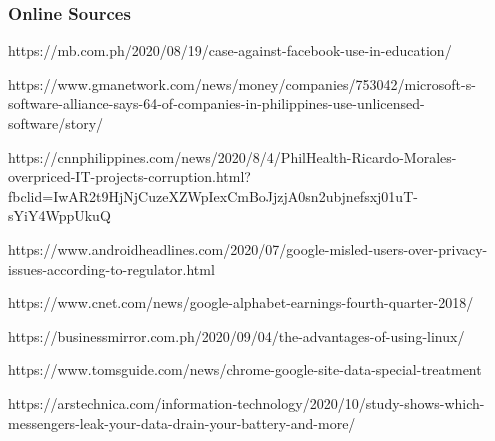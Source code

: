 \documentclass[17pt]{beamer}
\begin{document}
	\begin{frame}
		\frametitle{Online Sources}
		\tiny 
		https://mb.com.ph/2020/08/19/case-against-facebook-use-in-education/
\newline
		
		https://www.gmanetwork.com/news/money/companies/753042/microsoft-s-software-alliance-says-64-of-companies-in-philippines-use-unlicensed-software/story/
\newline
		
		https://cnnphilippines.com/news/2020/8/4/PhilHealth-Ricardo-Morales-overpriced-IT-projects-corruption.html?fbclid=IwAR2t9HjNjCuzeXZWpIexCmBoJjzjA0sn2ubjnefsxj01uT-sYiY4WppUkuQ
\newline
		
		https://www.androidheadlines.com/2020/07/google-misled-users-over-privacy-issues-according-to-regulator.html
\newline
		
		https://www.cnet.com/news/google-alphabet-earnings-fourth-quarter-2018/
\newline
		
		https://businessmirror.com.ph/2020/09/04/the-advantages-of-using-linux/
\newline


    https://www.tomsguide.com/news/chrome-google-site-data-special-treatment \newline

    https://arstechnica.com/information-technology/2020/10/study-shows-which-messengers-leak-your-data-drain-your-battery-and-more/
		
	\end{frame}	
	
\end{document}
